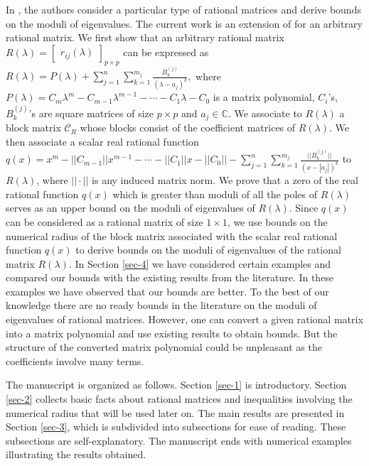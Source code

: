 \documentclass[12pt, reqno]{amsart}
\theoremstyle{definition}
\theoremstyle{remark}
\numberwithin{equation}{section}
\begin{document}
In \cite{Hadimani-Pallavi-Jayaraman}, the authors consider a 
particular type of rational matrices and derive bounds on the moduli of 
eigenvalues. The current work is an extension of \cite{Hadimani-Pallavi-Jayaraman} 
for an arbitrary rational matrix. We first show that an arbitrary rational matrix 
$R(\lambda)= \begin{bmatrix}
r_{ij}(\lambda)
\end{bmatrix} _{p\times p}$ can be expressed as $R(\lambda) = P(\lambda) +
\displaystyle \sum_{j=1}^{n} \sum_{k=1}^{m_j} \frac{B_k^{(j)}}{(\lambda-a_j)^k},$
where $P(\lambda)=C_m\lambda^m- C_{m-1}\lambda^{m-1} - \cdots -C_1 \lambda - C_0$ 
is a matrix polynomial, $C_i$'s, $B_k^{(j)}$'s are square matrices of size 
$p\times p$ and $a_j \in \mathbb{C}$. We associate to $R(\lambda)$ a block matrix 
$\mathcal{C}_R$ whose blocks consist of the coefficient matrices of $R(\lambda)$. 
We then associate a scalar real rational function $q(x) = x^m-||C_{m-1}||x^{m-1}-
\cdots - ||C_1|| x - ||C_0|| - \displaystyle \sum_{j=1}^{n} \sum_{k=1}^{m_j} 
\frac{||B_k^{(j)}||}{(x- |a_j|)^k}$ to $R(\lambda)$, where $||\cdot ||$ is any 
induced matrix norm. We prove that a zero of the real rational function $q(x)$ 
which is greater than moduli of all the poles of $R(\lambda)$ serves as an 
upper bound on the moduli of eigenvalues of $R(\lambda)$. Since $q(x)$ can 
be considered as a rational matrix of size $1 \times 1$, we use bounds on the 
numerical radius of the block matrix associated with the scalar real rational 
function $q(x)$ to derive bounds on the moduli of eigenvalues of the rational 
matrix $R(\lambda)$. In Section \ref{sec-4} we have considered certain examples 
and compared our bounds with the existing results from the literature. In these 
examples we have observed that our bounds are better. To the best of our 
knowledge there are no ready bounds in the literature on the moduli of 
eigenvalues of rational matrices. However, one can convert a given rational 
matrix into a matrix polynomial and use existing results to obtain bounds. 
But the structure of the converted matrix polynomial could be unpleasant as 
the coefficients involve many terms. 

The manuscript is organized as follows. Section \ref{sec-1} is introductory. 
Section \ref{sec-2} collects basic facts about rational matrices and inequalities 
involving the numerical radius that will be used later on. The main results 
are presented in Section \ref{sec-3}, which is subdivided into subsections for 
ease of reading. These subsections are self-explanatory. The manuscript ends 
with numerical examples illustrating the results obtained. 
\end{document}
